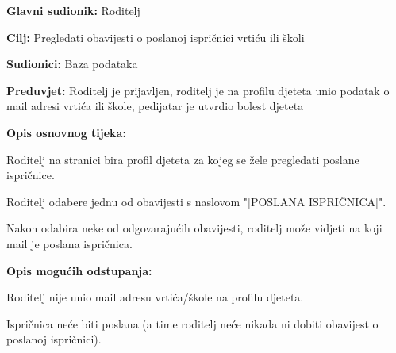 					
					\noindent {}
					\begin{packed_item}
						
						\item \textbf{Glavni sudionik: }Roditelj
						\item  \textbf{Cilj:} Pregledati obavijesti o poslanoj ispričnici vrtiću ili školi
						\item  \textbf{Sudionici:} Baza podataka
						\item  \textbf{Preduvjet:} Roditelj je prijavljen, roditelj je na profilu djeteta unio podatak o mail adresi vrtića ili škole, pedijatar je utvrdio bolest djeteta
						\item  \textbf{Opis osnovnog tijeka:}
						
						\item[] \begin{packed_enum}
							
							\item Roditelj na stranici bira profil djeteta za kojeg se žele pregledati poslane ispričnice.
							\item Roditelj odabere jednu od obavijesti s naslovom "[POSLANA ISPRIČNICA]".
							\item Nakon odabira neke od odgovarajućih obavijesti, roditelj može vidjeti na koji mail je poslana ispričnica.
						\end{packed_enum}
						\item  \textbf{Opis mogućih odstupanja:}
						
						\item[] \begin{packed_item}
							
							\item[2.a] Roditelj nije unio mail adresu vrtića/škole na profilu djeteta.
							\item[] \begin{packed_enum}
								
								\item Ispričnica neće biti poslana (a time roditelj neće nikada ni dobiti obavijest o poslanoj ispričnici).
							\end{packed_enum}
							
							
						\end{packed_item}
						
					\end{packed_item}
					
